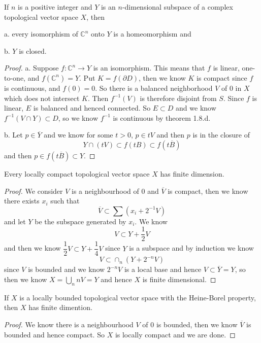 \documentclass[lang=en, color=blue, ]{elegantbook}
\newcommand{\C}{\mathbb{C}}
\begin{document}
\begin{theorem}
    If $n$ is a positive integer and $Y$ is an $n$-dimensional subspace of a complex topological vector space $X$, then\par
    a. every isomorphism of $\C^n$ onto $Y$ is a homeomorphism and\par
    b. $Y$ is closed.
\end{theorem}
\begin{proof}
    a. Suppose $f:\C^n \to Y$ is an isomorphism. This means that $f$ is linear, one-to-one, and $f(\C^n) = Y$. Put $K = f(\partial D)$, then we know $K$ is compact since $f$ is continuous, and $f(0) = 0$. So there is a balanced neighborhood $V$ of $0$ in $X$ which does not intersect $K$. Then $f^{-1}(V)$ is therefore disjoint from $S$. Since $f$ is linear, $E$ is balanced and henced connected. So $E\subset D$ and we know $f^{-1}(V\cap Y) \subset D$, so we know $f^{-1}$ is continuous by theorem 1.8.d. \par
    b. Let $p\in \overline{Y}$ and we know for some $t>0$, $p\in tV$ and then $p$ is in the closure of
    \[
    Y\cap (tV) \subset f(tB) \subset f(t\overline{B})
    \]
    and then $p\in f(t\overline{B}) \subset Y$.
\end{proof}

\begin{theorem}
    Every locally compact topological vector space $X$ has finite dimension.
\end{theorem}
\begin{proof}
    We consider $V$ is a neighbourhood of $0$ and $\overline{V}$ is compact, then we know there exists $x_i$ such that
    \[
    \overline{V} \subset \sum (x_i+2^{-1}V)
    \]
    and let $Y$ be the subspace generated by $x_i$. We know
    \[V \subset Y + \dfrac{1}{2}V\]
    and then we know $\dfrac{1}{2}V\subset Y + \dfrac{1}{4}V$ since $Y$ is a subspace and by induction we know
    \[
    V\subset \cap_{n} (Y+2^{-n} V)
    \]
    since $V$ is bounded and we know $2^{-n} V$ is a local base and hence $V\subset \overline{Y} = Y$, so then we know $X = \bigcup_{n} nV = Y$ and hence $X$ is finite dimensional.
\end{proof}

\begin{theorem}
    If $X$ is a locally bounded topological vector space with the Heine-Borel property, then $X$ has finite dimention.
\end{theorem}
\begin{proof}
    We know there is a neighbourhood $V$ of $0$ is bounded, then we know $\overline{V}$ is bounded and hence compact. So $X$ is locally compact and we are done.
\end{proof}
\end{document}
